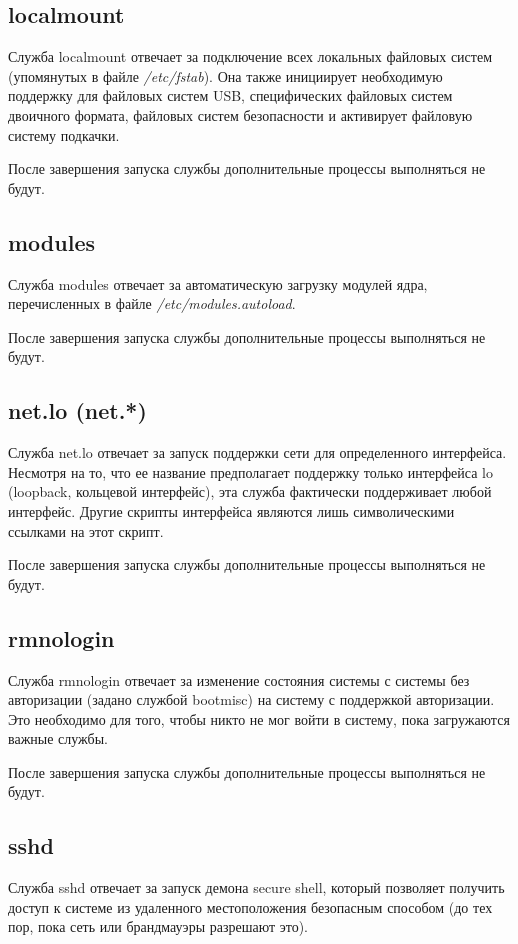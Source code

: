 \documentclass[10pt]{book}
\begin{document}
\subsection{localmount}
Служба localmount отвечает за подключение всех локальных файловых систем (упомянутых в файле \textit{/etc/fstab}). Она также инициирует необходимую поддержку для файловых систем USB, специфических файловых систем двоичного формата, файловых систем безопасности и активирует файловую систему подкачки.

После завершения запуска службы дополнительные процессы выполняться не будут.

\subsection{modules}
Служба modules отвечает за автоматическую загрузку модулей ядра, перечисленных в файле \textit{/etc/modules.autoload}.

После завершения запуска службы дополнительные процессы выполняться не будут.

\subsection{net.lo (net.*)}
Служба net.lo отвечает за запуск поддержки сети для определенного интерфейса. Несмотря на то, что ее название предполагает поддержку только интерфейса lo (loopback, кольцевой интерфейс), эта служба фактически поддерживает любой интерфейс. Другие скрипты интерфейса являются лишь символическими ссылками на этот скрипт.

После завершения запуска службы дополнительные процессы выполняться не будут.

\subsection{rmnologin}
Служба rmnologin отвечает за изменение состояния системы с системы без авторизации (задано службой bootmisc) на систему с поддержкой авторизации. Это необходимо для того, чтобы никто не мог войти в систему, пока загружаются важные службы.

После завершения запуска службы дополнительные процессы выполняться не будут.

\subsection{sshd}
Служба sshd отвечает за запуск демона secure shell, который позволяет получить доступ к системе из удаленного местоположения безопасным способом (до тех пор, пока сеть или брандмауэры разрешают это).
\end{document}
